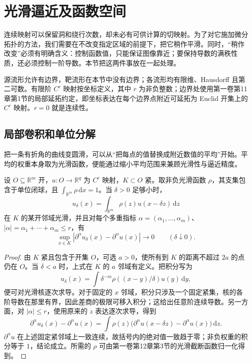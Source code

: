 
% 
% 

\section{光滑逼近及函数空间}
\label{g2:sec:1401}

连续映射可以保留洞和绕行次数，却未必有可供计算的切映射。为了对它施加微分拓扑的方法，我们需要在不改变指定区域的前提下，把它稍作平滑。同时，“稍作改变”必须有明确含义：控制函数值，只能保证图像靠近；要保持导数的满秩性质，还必须控制一阶导数。本节把这两件事放在一起处理。

源流形允许有边界，靶流形在本节中没有边界；各流形均有限维、Hausdorff 且第二可数。有限阶 \(C^r\) 映射按坐标定义，其中 \(r\) 为非负整数；边界处使用第一卷第11章第1节的局部延拓约定，即坐标表达在每个边界点附近可延拓为 Euclid 开集上的 \(C^r\) 映射。\(r=0\) 就是连续性。

\subsection{局部卷积和单位分解}
\label{g2:subsec:1401:01}

把一条有折角的曲线变圆滑，可以从“把每点的值替换成附近数值的平均”开始。平均的权重本身取为光滑函数，便能通过缩小平均范围来兼顾光滑性与逼近精度。

\begin{lemma}
	\label{g2:lem:local-smoothing}
	设 \(O\subseteq\mathbb R^m\) 开，\(u:O\to\mathbb R^q\) 为 \(C^r\) 映射，\(K\subset O\) 紧。取非负光滑函数 \(\rho\)，其支集包含于单位闭球，且 \(\int_{\mathbb R^m}\rho\,\mathrm{d}x=1\)。当 \(\delta>0\) 足够小时，
	\[
		u_\delta(x)=\int_{\mathbb R^m}\rho(z)u(x-\delta z)\,\mathrm{d}z
	\]
	在 \(K\) 的某开邻域光滑，并且对每个多重指标 \(\alpha=(\alpha_1,\ldots,\alpha_m)\)、\(|\alpha|=\alpha_1+\cdots+\alpha_m\le r\)，有
	\[
		\sup_{x\in K}|\partial^\alpha u_\delta(x)-\partial^\alpha u(x)|\longrightarrow0
		\qquad(\delta\downarrow0).
	\]
\end{lemma}
\begin{proof}
	由 \(K\) 紧且包含于开集 \(O\)，可选 \(a>0\)，使所有到 \(K\) 的距离不超过 \(2a\) 的点仍在 \(O\)。当 \(\delta<a\) 时，上式在 \(K\) 的 \(a\) 邻域有定义。把积分写为
	\[
		u_\delta(x)=\int \delta^{-m}\rho((x-y)/\delta)u(y)\,\mathrm{d}y,
	\]
	便可对光滑核逐次求导。对于固定的 \(x\) 邻域，积分只涉及一个固定紧集，核的各阶导数在那里有界，因此差商的极限可移入积分；这给出任意阶连续导数。另一方面，对 \(|\alpha|\le r\)，使用原来的 \(z\) 表达逐次求导，得到
	\[
		\partial^\alpha u_\delta(x)-\partial^\alpha u(x)
		=\int\rho(z)\bigl(\partial^\alpha u(x-\delta z)-\partial^\alpha u(x)\bigr)\,\mathrm{d}z.
	\]
	\(\partial^\alpha u\) 在上述固定紧邻域上一致连续，故括号内的绝对值一致趋于零；非负权重的积分等于 \(1\)，结论成立。所需的 \(\rho\) 可由第一卷第12章第3节的光滑截断函数归一化得到。
\end{proof}

